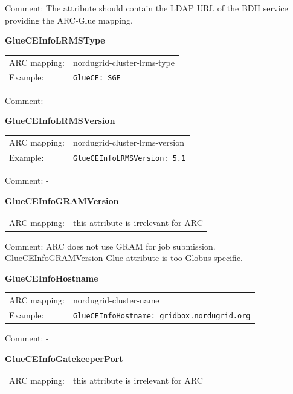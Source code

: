 \documentclass{article}
\begin{document}
Comment: The attribute should contain the LDAP URL of the BDII service
providing the ARC-Glue mapping.


\hspace*{0.5cm}
\begin{shaded}
 \textbf{GlueCEInfoLRMSType} 
\end{shaded}
\begin{tabular}{lp{10cm}}  
  ARC mapping:& nordugrid-cluster-lrms-type\\
  Example:& \verb#GlueCE: SGE#\\
\end{tabular}

Comment: -


\hspace*{0.5cm}
\begin{shaded}
 \textbf{GlueCEInfoLRMSVersion} 
\end{shaded}
\begin{tabular}{lp{10cm}}  
  ARC mapping:& nordugrid-cluster-lrms-version\\
  Example:& \verb#GlueCEInfoLRMSVersion: 5.1#\\
\end{tabular}

Comment: -


\hspace*{0.5cm}
\begin{shaded}
 \textbf{GlueCEInfoGRAMVersion} 
\end{shaded}
\begin{tabular}{lp{10cm}}  
  ARC mapping:& this attribute is irrelevant for ARC\\   
\end{tabular}

Comment: ARC does not use GRAM for job submission.
GlueCEInfoGRAMVersion Glue attribute is too Globus specific.


\hspace*{0.5cm}
\begin{shaded}
 \textbf{GlueCEInfoHostname} 
\end{shaded}
\begin{tabular}{lp{10cm}}  
  ARC mapping:& nordugrid-cluster-name\\
  Example:& \verb#GlueCEInfoHostname: gridbox.nordugrid.org#\\
\end{tabular}

Comment: -


\hspace*{0.5cm}
\begin{shaded}
 \textbf{GlueCEInfoGatekeeperPort} 
\end{shaded}
\begin{tabular}{lp{10cm}}  
  ARC mapping:& this attribute is irrelevant for ARC\\   
\end{tabular}
\end{document}
